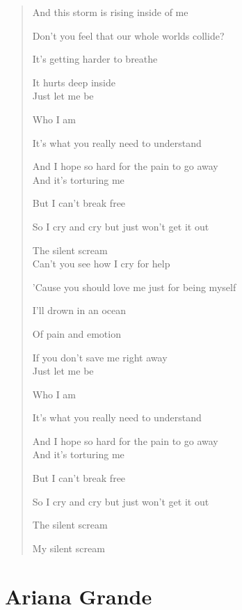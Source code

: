 \documentclass{book}
\numberwithin{equation}{section}
\begin{document}
\begin{quotation}
    And this storm is rising inside of me
    
    Don't you feel that our whole worlds collide?
    
    It's getting harder to breathe
    
    It hurts deep inside
    \\
    
    Just let me be
    
    Who I am
    
    It's what you really need to understand
    
    And I hope so hard for the pain to go away
    \\
    
    And it's torturing me
    
    But I can't break free
    
    So I cry and cry but just won't get it out
    
    The silent scream
    \\
    
    Can't you see how I cry for help
    
    'Cause you should love me just for being myself
    
    I'll drown in an ocean
    
    Of pain and emotion
    
    If you don't save me right away
    \\
    
    Just let me be
    
    Who I am
    
    It's what you really need to understand
    
    And I hope so hard for the pain to go away
    \\
    
    And it's torturing me
    
    But I can't break free
    
    So I cry and cry but just won't get it out
    
    The silent scream
    
    My silent scream
\end{quotation}


\chapter{Ariana Grande}
\end{document}
